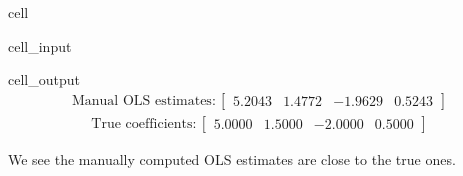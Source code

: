 \documentclass[letterpaper,10pt,english]{jupyterBook}
\begin{document}
\begin{sphinxuseclass}{cell}\begin{sphinxVerbatimInput}

\begin{sphinxuseclass}{cell_input}
\begin{sphinxVerbatim}[commandchars=\\\{\}]
    
  
    
    

  

 
 
\end{sphinxVerbatim}

\end{sphinxuseclass}\end{sphinxVerbatimInput}
\begin{sphinxVerbatimOutput}

\begin{sphinxuseclass}{cell_output}\begin{equation*}
\begin{split}\displaystyle \text{Manual OLS estimates}:\left[
\begin{array}{}
  5.2043 &  1.4772 & -1.9629 &  0.5243
\end{array}
\right]\end{split}
\end{equation*}\begin{equation*}
\begin{split}\displaystyle \text{True coefficients}:\left[
\begin{array}{}
  5.0000 &  1.5000 & -2.0000 &  0.5000
\end{array}
\right]\end{split}
\end{equation*}
\end{sphinxuseclass}\end{sphinxVerbatimOutput}

\end{sphinxuseclass}
\sphinxAtStartPar
We see the manually computed OLS estimates are close to the true ones.
\end{document}
